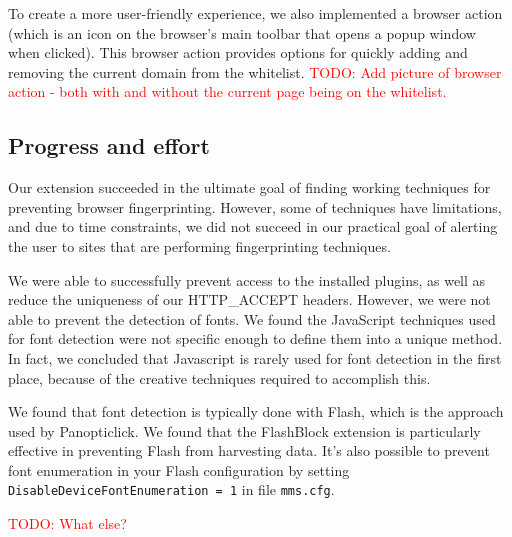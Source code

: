 \documentclass[12pt,a4paper]{article}
\begin{document}
To create a more user-friendly experience, we also implemented a browser action (which is an icon on the browser's main toolbar that opens a popup window when clicked). This browser action provides options for quickly adding and removing the current domain from the whitelist. \textcolor{red}{TODO: Add picture of browser action - both with and without the current page being on the whitelist.}

\subsection{Progress and effort}
Our extension succeeded in the ultimate goal of finding working techniques for preventing browser fingerprinting. However, some of techniques have limitations, and due to time constraints, we did not succeed in our practical goal of alerting the user to sites that are performing fingerprinting techniques.

We were able to successfully prevent access to the installed plugins, as well as reduce the uniqueness of our HTTP\_ACCEPT headers. However, we were not able to prevent the detection of fonts. We found the JavaScript techniques used for font detection were not specific enough to define them into a unique method. In fact, we concluded that Javascript is rarely used for font detection in the first place, because of the creative techniques required to accomplish this.

We found that font detection is typically done with Flash, which is the approach used by Panopticlick. We found that the FlashBlock extension\cite{flashblock} is particularly effective in preventing Flash from harvesting data. It's also possible to prevent font enumeration in your Flash configuration by setting \texttt{DisableDeviceFontEnumeration = 1} in file \texttt{mms.cfg}.

\textcolor{red}{TODO: What else?}
\end{document}
